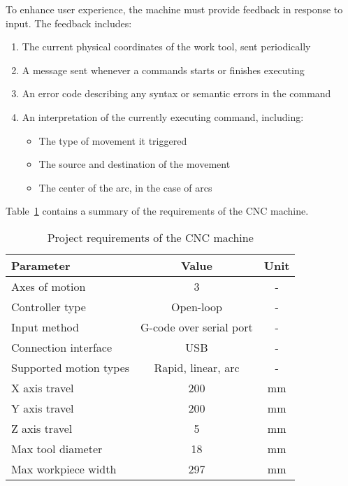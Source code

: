 To enhance user experience, the machine must provide feedback in response to
input. The feedback includes:
\begin{enumerate}
    \item The current physical coordinates of the work tool, sent periodically
    \item A message sent whenever a commands starts or finishes executing
    \item An error code describing any syntax or semantic errors in the command
    \item An interpretation of the currently executing command, including:
        \begin{itemize}
            \item The type of movement it triggered
            \item The source and destination of the movement
            \item The center of the arc, in the case of arcs
        \end{itemize}
\end{enumerate}

Table~\ref{table:projectRequirements} contains a summary of the requirements
of the CNC machine.

\begin{table}[ht]
    \begin{center}
        \begin{tabular}{ |l|c|c| }
            \hline
            Parameter & Value & Unit \\
            \hline
            Axes of motion & 3 & - \\
            Controller type & Open-loop & - \\
            Input method & G-code over serial port & - \\
            Connection interface & USB & - \\
            Supported motion types & Rapid, linear, arc & - \\
            X axis travel & 200 & mm \\
            Y axis travel & 200 & mm \\
            Z axis travel & 5 & mm \\
            Max tool diameter & 18 & mm \\
            Max workpiece width & 297 & mm \\
            \hline
        \end{tabular}
        \caption{Project requirements of the CNC machine}
        \label{table:projectRequirements}
    \end{center}
\end{table}

